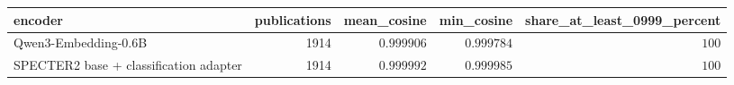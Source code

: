 \begin{tabular}{lrrrr}
\toprule
encoder & publications & mean\_cosine & min\_cosine & share\_at\_least\_0999\_percent \\
\midrule
Qwen3-Embedding-0.6B & 1914 & $0.999906$ & $0.999784$ & $100$ \\
SPECTER2 base + classification adapter & 1914 & $0.999992$ & $0.999985$ & $100$ \\
\bottomrule
\end{tabular}
